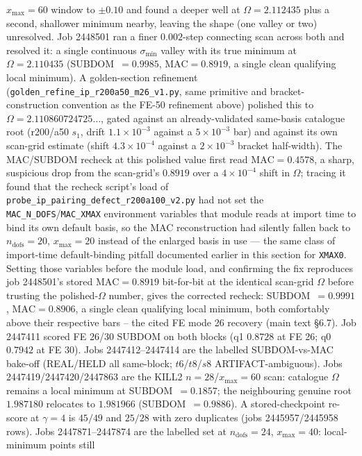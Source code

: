 \documentclass[11pt]{article}
\begin{document}
\begin{itemize}
$x_{\max}=60$ window to $\pm0.10$ and found a deeper well at
$\Omega=2.112435$ plus a second, shallower minimum nearby, leaving
the shape (one valley or two) unresolved. Job 2448501 ran a finer
$0.002$-step connecting scan across both and resolved it: a single
continuous $\sigma_{\min}$ valley with its true minimum at
$\Omega=2.110435$ (SUBDOM~$=0.9985$, $\mathrm{MAC}=0.8919$, a
single clean qualifying local minimum). A golden-section refinement
(\texttt{golden\_refine\_ip\_r200a50\_m26\_v1.py}, same primitive
and bracket-construction convention as the FE-50 refinement above)
polished this to $\Omega=2.110860724725\ldots$, gated against an
already-validated same-basis catalogue root (r200/a50 $s_1$, drift
$1.1\times10^{-3}$ against a $5\times10^{-3}$ bar) and against its
own scan-grid estimate (shift $4.3\times10^{-4}$ against a $2\times
10^{-3}$ bracket half-width). The MAC/SUBDOM recheck at this polished
value first read $\mathrm{MAC}=0.4578$, a sharp, suspicious drop from
the scan-grid's $0.8919$ over a $4\times10^{-4}$ shift in $\Omega$;
tracing it found that the recheck script's load of
\texttt{probe\_ip\_pairing\_defect\_r200a100\_v2.py} had not set the
\texttt{MAC\_N\_DOFS}/\texttt{MAC\_XMAX} environment variables that
module reads at import time to bind its own default basis, so the MAC
reconstruction had silently fallen back to $n_{\mathrm{dofs}}=20$,
$x_{\max}=20$ instead of the enlarged basis in use --- the same class
of import-time default-binding pitfall documented earlier in this
section for \texttt{XMAX0}. Setting those variables before the module
load, and confirming the fix reproduces job 2448501's stored
$\mathrm{MAC}=0.8919$ bit-for-bit at the identical scan-grid $\Omega$
before trusting the polished-$\Omega$ number, gives the corrected
recheck: SUBDOM~$=0.9991$, $\mathrm{MAC}=0.8906$, a single clean
qualifying local minimum, both comfortably above their respective
bars -- the cited FE mode 26 recovery (main text \S6.7).
Job 2447411 scored FE 26/30 SUBDOM on both blocks (q1 $0.8728$ at FE 26;
q0 $0.7942$ at FE 30). Jobs 2447412--2447414 are the labelled
SUBDOM-vs-MAC bake-off (REAL/HELD all same-block; $t6$/$t8$/$s8$
ARTIFACT-ambiguous). Jobs 2447419/2447420/2447863 are the KILL2
$n=28$/$x_{\max}=60$ scan: catalogue $\Omega$ remains a local minimum
at SUBDOM~$=0.1857$; the neighbouring genuine root $1.987180$ relocates
to $1.981966$ (SUBDOM~$=0.9886$). A stored-checkpoint re-score at
$\gamma=4$ is $45/49$ and $25/28$ with zero duplicates (jobs
2445957/2445958 rows). Jobs 2447871--2447874 are the labelled set at
$n_{\mathrm{dofs}}=24$, $x_{\max}=40$: local-minimum points still

\end{itemize}
\end{document}
